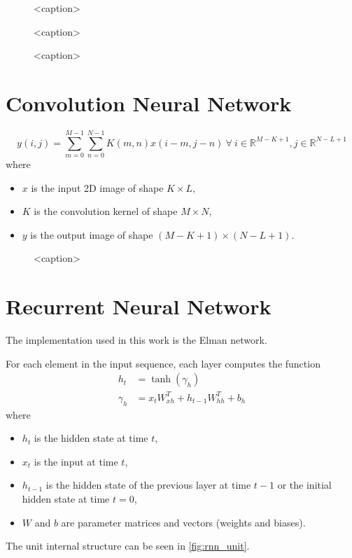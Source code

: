 \begin{figure}[htbp]
    \centering
    \caption{<caption>}
    \label{<label>}
\end{figure}

\begin{figure}[htbp]
    \centering
    \caption{<caption>}
    \label{<label>}
\end{figure}

\begin{figure}[htbp]
    \centering
    \caption{<caption>}
    \label{<label>}
\end{figure}

\section{Convolution Neural Network}

\begin{equation}
    y(i, j) = \sum^{M-1}_{m=0}\sum^{N-1}_{n=0} K(m,n)x(i-m, j-n)~\forall~i \in \mathbb{R}^{M-K+1}, j \in \mathbb{R}^{N-L+1}
\end{equation}
where
\begin{itemize}
    \item $x$ is the input 2D image of shape $K \times L$,
    \item $K$ is the convolution kernel of shape $M \times N$,
    \item $y$ is the output image of shape $(M-K+1) \times (N-L+1)$.
\end{itemize}

\begin{figure}[htbp]
    \centering
    \caption{<caption>}
    \label{<label>}
\end{figure}

\section{Recurrent Neural Network}

The  implementation used in this work is the Elman network.

For each element in the input sequence, each layer computes the function
\begin{align}
    h_t &= \tanh (\gamma_h) \\
    \gamma_h &= x_t W^T_{xh} + h_{t-1}W_{hh}^T + b_h
\end{align}
where
\begin{itemize}
    \item $h_t$ is the hidden state at time $t$,
    \item $x_t$ is the input at time $t$,
    \item $h_{t-1}$ is the hidden state of the previous layer at time $t-1$ or the initial hidden state at time $t=0$,
    \item $W$ and $b$ are parameter matrices and vectors (weights and biases).
\end{itemize}
The  unit internal structure can be seen in \autoref{fig:rnn_unit}.

